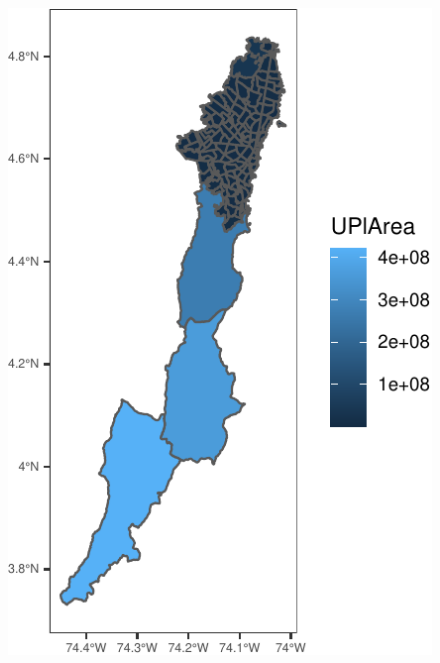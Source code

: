 \documentclass[
  shownotes,
  xcolor={svgnames},
  hyperref={colorlinks,citecolor=DarkBlue,linkcolor=DarkRed,urlcolor=DarkBlue}
   , aspectratio=169]{beamer}
\begin{document}
\begin{frame}[fragile]
\begin{minipage}[t]{0.43\linewidth}
\begin{figure}[H]
\includegraphics[scale=0.6]{figures/unnamed-chunk-2-2.pdf}
 \end{figure}
    \end{minipage}
\end{frame}
\end{document}
